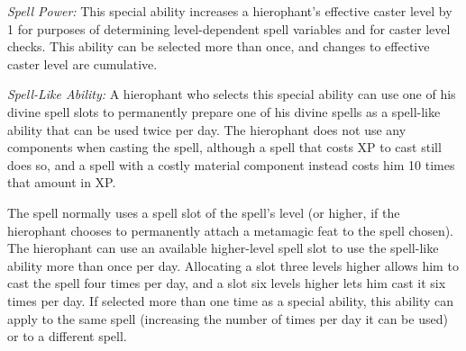 \textit{Spell Power:} This special ability increases a hierophant's effective caster 
level by 1 for purposes of determining level-dependent spell variables and for 
caster level checks. This ability can be selected more than once, and changes to 
effective caster level are cumulative.

\textit{Spell-Like Ability:} A hierophant who selects this special ability can 
use one of his divine spell slots to permanently prepare one of his divine spells 
as a spell-like ability that can be used twice per day. The hierophant does not 
use any components when casting the spell, although a spell that costs XP to cast 
still does so, and a spell with a costly material component instead costs him 10 
times that amount in XP.

The spell normally uses a spell slot of the spell's level (or higher, if the hierophant 
chooses to permanently attach a metamagic feat to the spell chosen). The hierophant 
can use an available higher-level spell slot to use the spell-like ability more 
than once per day. Allocating a slot three levels higher allows him to cast the 
spell four times per day, and a slot six levels higher lets him cast it six times 
per day. If selected more than one time as a special ability, this ability can 
apply to the same spell (increasing the number of times per day it can be used) 
or to a different spell.
